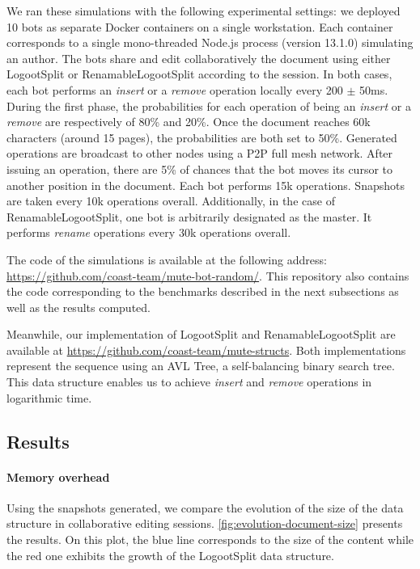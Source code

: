 \documentclass[sigplan,10pt]{acmart}
\begin{document}
We ran these simulations with the following experimental settings: we deployed 10 bots as separate Docker containers on a single workstation.
Each container corresponds to a single mono-threaded Node.js process (version 13.1.0) simulating an author.
The bots share and edit collaboratively the document using either LogootSplit or RenamableLogootSplit according to the session.
In both cases, each bot performs an \emph{insert} or a \emph{remove} operation locally every 200 $\pm$ 50ms.
During the first phase, the probabilities for each operation of being an \emph{insert} or a \emph{remove} are respectively of 80\% and 20\%.
Once the document reaches 60k characters (around 15 pages), the probabilities are both set to 50\%.
Generated operations are broadcast to other nodes using a \ac{P2P} full mesh network.
After issuing an operation, there are 5\% of chances that the bot moves its cursor to another position in the document.
Each bot performs 15k operations.
Snapshots are taken every 10k operations overall.
Additionally, in the case of RenamableLogootSplit, one bot is arbitrarily designated as the master.
It performs \emph{rename} operations every 30k operations overall.

The code of the simulations is available at the following address: \url{https://github.com/coast-team/mute-bot-random/}.
This repository also contains the code corresponding to the benchmarks described in the next subsections as well as the results computed.

\begin{sloppypar}
Meanwhile, our implementation of LogootSplit and RenamableLogootSplit are available at \url{https://github.com/coast-team/mute-structs}.
Both implementations represent the sequence using an AVL Tree, a self-balancing binary search tree.
This data structure enables us to achieve \emph{insert} and \emph{remove} operations in logarithmic time.
\end{sloppypar}

\subsection{Results}

\paragraph{Memory overhead}

Using the snapshots generated, we compare the evolution of the size of the data structure in collaborative editing sessions.
\autoref{fig:evolution-document-size} presents the results.
On this plot, the blue line corresponds to the size of the content while the red one exhibits the growth of the LogootSplit data structure.
\end{document}
